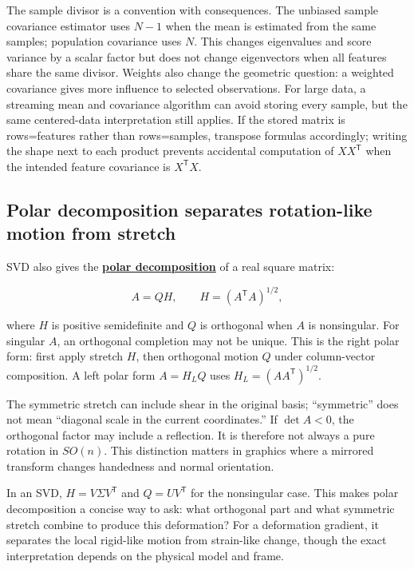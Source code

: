 The sample divisor is a convention with consequences. The unbiased sample covariance estimator uses \(N-1\) when the mean is estimated from the same samples; population covariance uses \(N\). This changes eigenvalues and score variance by a scalar factor but does not change eigenvectors when all features share the same divisor. Weights also change the geometric question: a weighted covariance gives more influence to selected observations. For large data, a streaming mean and covariance algorithm can avoid storing every sample, but the same centered-data interpretation still applies. If the stored matrix is rows=features rather than rows=samples, transpose formulas accordingly; writing the shape next to each product prevents accidental computation of \(XX^\mathsf T\) when the intended feature covariance is \(X^\mathsf TX\).

\subsection{Polar decomposition separates rotation-like motion from stretch}\label{02-foundations-ii-ch024-polar-decomposition-separates-rotation-like-motion-from-stretch}

\hypertarget{02-foundations-ii-ch024-polar-decomposition-separates-rotation-like-motion-from-stretch}{}

SVD also gives the \textbf{\hyperref[02-foundations-ii-ch024-polar-decomposition-separates-frame-dependent-stretch-from-orientation]{polar decomposition}} of a real square matrix:

\[
A=QH,
\qquad H=(A^\mathsf T A)^{1/2},
\]

where \(H\) is positive semidefinite and \(Q\) is orthogonal when \(A\) is nonsingular. For singular \(A\), an orthogonal completion may not be unique. This is the right polar form: first apply stretch \(H\), then orthogonal motion \(Q\) under column-vector composition. A left polar form \(A=H_LQ\) uses \(H_L=(AA^\mathsf T)^{1/2}\).

The symmetric stretch can include shear in the original basis; ``symmetric'' does not mean ``diagonal scale in the current coordinates.'' If \(\det A<0\), the orthogonal factor may include a reflection. It is therefore not always a pure rotation in \(SO(n)\). This distinction matters in graphics where a mirrored transform changes handedness and normal orientation.

In an SVD, \(H=V\Sigma V^\mathsf T\) and \(Q=UV^\mathsf T\) for the nonsingular case. This makes polar decomposition a concise way to ask: what orthogonal part and what symmetric stretch combine to produce this deformation? For a deformation gradient, it separates the local rigid-like motion from strain-like change, though the exact interpretation depends on the physical model and frame.

